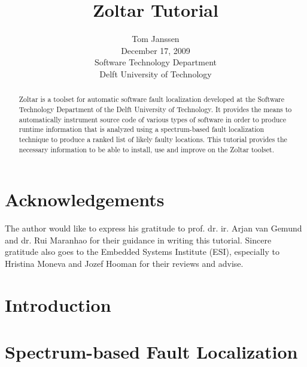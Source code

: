\documentclass[letterpaper]{report}
\title{Zoltar Tutorial}
\date{}
\author{Tom Janssen\\
	December 17, 2009\\
	Software Technology Department\\
	Delft University of Technology}
\begin{document}
\maketitle{}
\lstset{language=C, 
		basicstyle=\small, 
		frame=single, 
		frameround=tttt,
		numbers=left, 
		numberstyle=\tiny, 
		xleftmargin=0cm, 
		xrightmargin=0cm,
		float=h!}

		
\begin{abstract}

Zoltar is a toolset for automatic software fault localization developed at 
the Software Technology Department of the Delft University of Technology.
It provides the means to automatically instrument source code of various types of software
in order to produce runtime information that is analyzed using 
a spectrum-based fault localization technique to produce a ranked list of likely faulty locations.
This tutorial provides the necessary information to be able to install, use and improve on the
Zoltar toolset.
\end{abstract}


\tableofcontents{}


\chapter*{Acknowledgements}
The author would like to express his gratitude to prof. dr. ir. Arjan van Gemund and
dr. Rui Maranhao for their guidance in writing this tutorial.
Sincere gratitude also goes to the Embedded Systems Institute (ESI), especially
to Hristina Moneva and Jozef Hooman for their reviews and advise.


\chapter{Introduction}
\label{c:Introduction}



\chapter{Spectrum-based Fault Localization}
\label{c:SFL}



\end{document}
